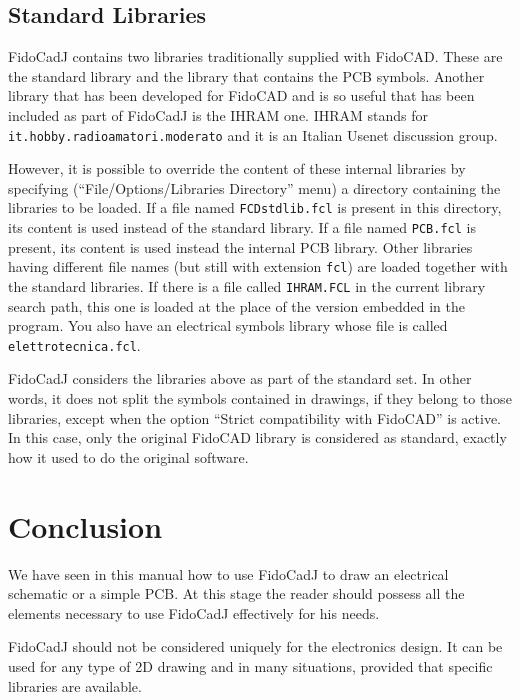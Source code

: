 \documentclass[10pt,a4paper,twoside]{scrreprt}
\begin{document}
\section{Standard Libraries}

FidoCadJ contains two libraries traditionally supplied with
FidoCAD. These are the standard library
and the library that contains the PCB symbols. Another library that has been developed for FidoCAD and is so useful that has been included as part of FidoCadJ is the IHRAM one. IHRAM stands for \lstinline!it.hobby.radioamatori.moderato! and it is an Italian Usenet discussion group.

However, it is possible to override the content of these internal
libraries by specifying (``File/Options/Libraries Directory'' menu)
a directory containing the libraries to be loaded. If a file named
\lstinline!FCDstdlib.fcl! is present in this directory, its content is used instead of the standard library. If a file named
\lstinline!PCB.fcl! is present, its content is used instead the internal PCB library. Other libraries having different file
names (but still with extension \lstinline!fcl!) are loaded together
with the standard libraries. If there is a file called \lstinline!IHRAM.FCL! in the current library search path, this one is loaded at the place
of the version embedded in the program. You also have an electrical symbols library whose file is called \lstinline!elettrotecnica.fcl!.

FidoCadJ considers the libraries above as part of the standard set. In other words, it does not split the symbols contained in drawings, if they belong to those libraries, except when the option ``Strict compatibility with FidoCAD'' is active. In this case, only the original FidoCAD library is considered as standard, exactly how it used to do the original software.


\chapter{Conclusion} We have seen in this manual how to use FidoCadJ
to draw an electrical schematic or a simple PCB. At this stage the
reader should possess all the elements necessary to use FidoCadJ effectively
for his needs.

FidoCadJ should not be considered uniquely for the
electronics design. It can be used for any type of 2D drawing and
in many situations, provided that specific libraries are available.
\end{document}
